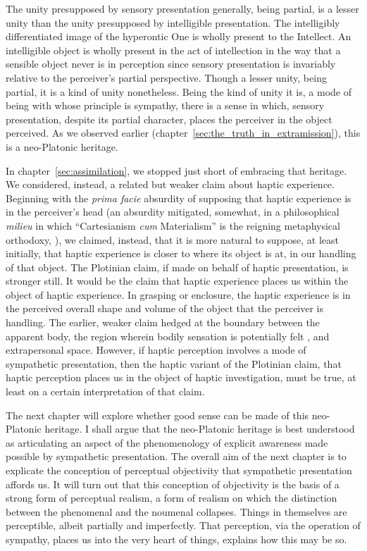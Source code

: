 The unity presupposed by sensory presentation generally, being partial, is a lesser unity than the unity presupposed by intelligible presentation. The intelligibly differentiated image of the hyperontic One is wholly present to the Intellect. An intelligible object is wholly present in the act of intellection in the way that a sensible object never is in perception since sensory presentation is invariably relative to the perceiver's partial perspective. Though a lesser unity, being partial, it is a kind of unity nonetheless. Being the kind of unity it is, a mode of being with whose principle is sympathy, there is a sense in which, sensory presentation, despite its partial character, places the perceiver in the object perceived. As we observed earlier (chapter~\ref{sec:the_truth_in_extramission}), this is a neo-Platonic heritage. 

In chapter~\ref{sec:assimilation}, we stopped just short of embracing that heritage. We considered, instead, a related but weaker claim about haptic experience. Beginning with the \emph{prima facie} absurdity of supposing that haptic experience is in the perceiver's head (an absurdity mitigated, somewhat, in a philosophical \emph{milieu} in which ``Cartesianism \emph{cum} Materialism'' is the reigning metaphysical orthodoxy, \citealt{Putnam:1993kx,Putnam:1994kx,Putnam:1999eu}), we claimed, instead, that it is more natural to suppose, at least initially, that haptic experience is closer to where its object is at, in our handling of that object. The Plotinian claim, if made on behalf of haptic presentation, is stronger still. It would be the claim that haptic experience places us within the object of haptic experience. In grasping or enclosure, the haptic experience is in the perceived overall shape and volume of the object that the perceiver is handling. The earlier, weaker claim hedged at the boundary between the apparent body, the region wherein bodily sensation is potentially felt \citep{Martin:1992aa}, and extrapersonal space. However, if haptic perception involves a mode of sympathetic presentation, then the haptic variant of the Plotinian claim, that haptic perception places us in the object of haptic investigation, must be true, at least on a certain interpretation of that claim. 

The next chapter will explore whether good sense can be made of this neo-Platonic heritage. I shall argue that the neo-Platonic heritage is best understood as articulating an aspect of the phenomenology of explicit awareness made possible by sympathetic presentation. The overall aim of the next chapter is to explicate the conception of perceptual objectivity that sympathetic presentation affords us. It will turn out that this conception of objectivity is the basis of a strong form of perceptual realism, a form of realism on which the distinction between the phenomenal and the noumenal collapses. Things in themselves are perceptible, albeit partially and imperfectly. That perception, via the operation of sympathy, places us into the very heart of things, explains how this may be so.






